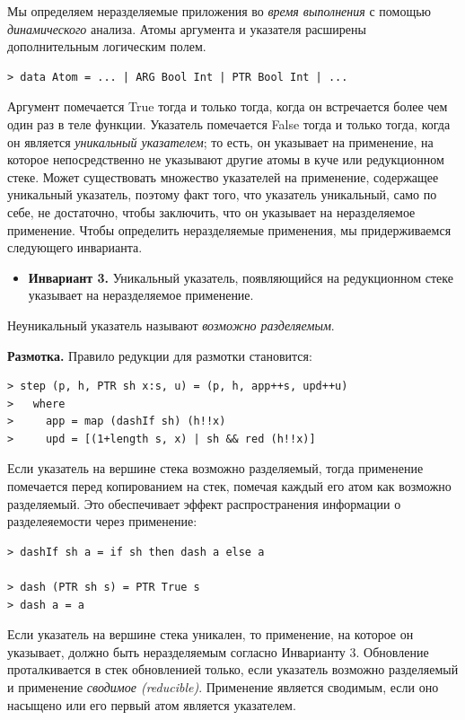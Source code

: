 \documentclass[flenqn, 14pt]{extarticle}
\begin{document}
Мы определяем неразделяемые приложения во \textit{время выполнения} с помощью \textit{динамического} анализа. Атомы аргумента и указателя расширены дополнительным логическим полем.
\begin{verbatim}
> data Atom = ... | ARG Bool Int | PTR Bool Int | ...
\end{verbatim}

Аргумент помечается True тогда и только тогда, когда он встречается более чем один раз в теле функции. Указатель помечается False тогда и только тогда, когда он является \textit{уникальный указателем}; то есть, он указывает на применение, на которое непосредственно не указывают другие атомы в куче или редукционном стеке. Может существовать множество указателей на применение, содержащее уникальный указатель, поэтому факт того, что указатель уникальный, само по себе, не достаточно, чтобы заключить, что он указывает на неразделяемое применение. Чтобы определить неразделяемые применения, мы придерживаемся следующего инварианта.

\begin{itemize}
\item \textbf{Инвариант 3.} Уникальный указатель, появляющийся на редукционном стеке указывает на неразделяемое применение.
\end{itemize}

Неуникальный указатель называют \textit{возможно разделяемым}.

\textbf{Размотка.} Правило редукции для размотки становится:
\begin{verbatim}
> step (p, h, PTR sh x:s, u) = (p, h, app++s, upd++u)
>   where
>     app = map (dashIf sh) (h!!x)
>     upd = [(1+length s, x) | sh && red (h!!x)]
\end{verbatim}

Если указатель на вершине стека возможно разделяемый, тогда применение помечается перед копированием на стек, помечая каждый его атом как возможно разделяемый. Это обеспечивает эффект распространения информации о разделеяемости через применение:

\begin{verbatim}
> dashIf sh a = if sh then dash a else a

> dash (PTR sh s) = PTR True s
> dash a = a
\end{verbatim}

Если указатель на вершине стека уникален, то применение, на которое он указывает, должно быть неразделяемым согласно Инварианту 3. Обновление проталкивается в стек обновленией только, если указатель возможно разделяемый и применение \textit{сводимое (reducible)}. Применение является сводимым, если оно насыщено или его первый атом является указателем.
\end{document}
